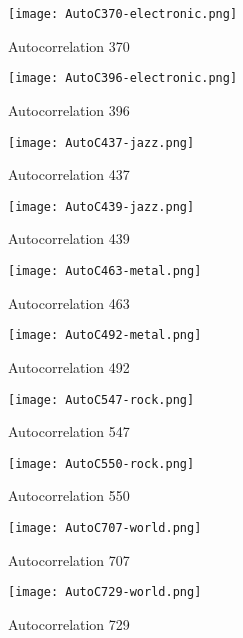 \documentclass{article} %
\begin{document}
\begin{figure}[H]
\centering
\texttt{[image: AutoC370-electronic.png]}
\caption{Autocorrelation 370}
\label{fig:auto370_1}
\end{figure}

\begin{figure}[H]
\centering
\texttt{[image: AutoC396-electronic.png]}
\caption{Autocorrelation 396}
\label{fig:auto396_1}
\end{figure}

\begin{figure}[H]
\centering
\texttt{[image: AutoC437-jazz.png]}
\caption{Autocorrelation 437}
\label{fig:auto437_1}
\end{figure}

\begin{figure}[H]
\centering
\texttt{[image: AutoC439-jazz.png]}
\caption{Autocorrelation 439}
\label{fig:auto439_1}
\end{figure}

\begin{figure}[H]
\centering
\texttt{[image: AutoC463-metal.png]}
\caption{Autocorrelation 463}
\label{fig:auto463_1}
\end{figure}

\begin{figure}[H]
\centering
\texttt{[image: AutoC492-metal.png]}
\caption{Autocorrelation 492}
\label{fig:auto492_1}
\end{figure}

\begin{figure}[H]
\centering
\texttt{[image: AutoC547-rock.png]}
\caption{Autocorrelation 547}
\label{fig:auto547_1}
\end{figure}

\begin{figure}[H]
\centering
\texttt{[image: AutoC550-rock.png]}
\caption{Autocorrelation 550}
\label{fig:auto550_1}
\end{figure}

\begin{figure}[H]
\centering
\texttt{[image: AutoC707-world.png]}
\caption{Autocorrelation 707}
\label{fig:auto707_1}
\end{figure}

\begin{figure}[H]
\centering
\texttt{[image: AutoC729-world.png]}
\caption{Autocorrelation 729}
\label{fig:auto729_1}
\end{figure}
\clearpage
\end{document}
